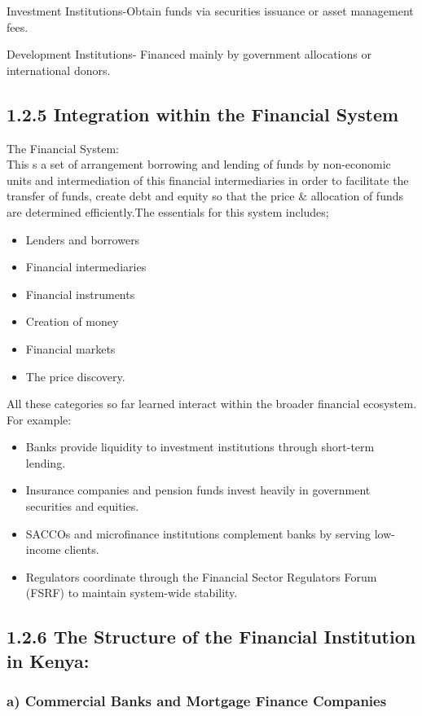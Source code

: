 \documentclass[10pt]{article}
\begin{document}
Investment Institutions-Obtain funds via securities issuance or asset management fees.

Development Institutions- Financed mainly by government allocations or international donors.

\subsection*{1.2.5 Integration within the Financial System}
The Financial System:\\
This s a set of arrangement borrowing and lending of funds by non-economic units and intermediation of this financial intermediaries in order to facilitate the transfer of funds, create debt and equity so that the price \& allocation of funds are determined efficiently.The essentials for this system includes;

\begin{itemize}
  \item Lenders and borrowers
  \item Financial intermediaries
  \item Financial instruments
  \item Creation of money
  \item Financial markets
  \item The price discovery.
\end{itemize}

All these categories so far learned interact within the broader financial ecosystem. For example:

\begin{itemize}
  \item Banks provide liquidity to investment institutions through short-term lending.
  \item Insurance companies and pension funds invest heavily in government securities and equities.
  \item SACCOs and microfinance institutions complement banks by serving low-income clients.
  \item Regulators coordinate through the Financial Sector Regulators Forum (FSRF) to maintain system-wide stability.
\end{itemize}

\subsection*{1.2.6 The Structure of the Financial Institution in Kenya:}
\subsubsection*{a) Commercial Banks and Mortgage Finance Companies}
\end{document}
